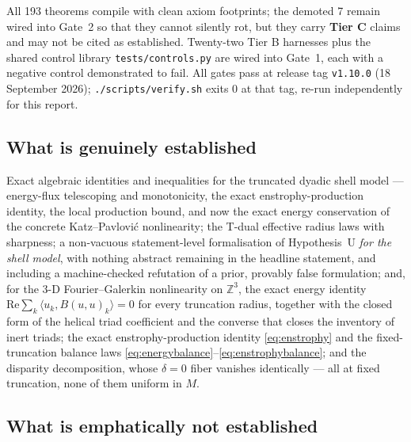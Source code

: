 \documentclass[11pt,a4paper]{article}
\newcommand{\tC}{\textcolor{TierC}{\textbf{Tier C}}}
\newcommand{\Z}{\mathbb{Z}}
\theoremstyle{definition}
\theoremstyle{plain}
\begin{document}

All 193 theorems compile with clean axiom footprints; the demoted 7 remain wired into Gate~2 so
that they cannot silently rot, but they carry \tC{} claims and may not be cited as established.
Twenty-two Tier B harnesses plus the shared control library \texttt{tests/controls.py} are
wired into Gate~1, each with a negative control demonstrated to fail. All gates pass at release
tag \texttt{v1.10.0} (18 September 2026); \texttt{./scripts/verify.sh} exits 0 at that tag,
re-run independently for this report.

\subsection{What is genuinely established}

Exact algebraic identities and inequalities for the truncated dyadic shell model --- energy-flux
telescoping and monotonicity, the exact enstrophy-production identity, the local production
bound, and now the exact energy conservation of the concrete Katz--Pavlovi\'c nonlinearity; the
T-dual effective radius laws with sharpness; a non-vacuous statement-level formalisation of
Hypothesis~U \emph{for the shell model}, with nothing abstract remaining in the headline
statement, and including a machine-checked refutation of a prior, provably false formulation;
and, for the 3-D Fourier--Galerkin nonlinearity on $\Z^3$, the exact energy identity
$\mathrm{Re}\sum_k\langle u_k,B(u,u)_k\rangle=0$ for every truncation radius, together with the
closed form of the helical triad coefficient and the converse that closes the inventory of inert
triads; the exact enstrophy-production identity \eqref{eq:enstrophy} and the fixed-truncation
balance laws \eqref{eq:energybalance}--\eqref{eq:enstrophybalance}; and the disparity
decomposition, whose $\delta=0$ fiber vanishes identically --- all at fixed truncation, none of
them uniform in $M$.

\subsection{What is emphatically not established}
\end{document}
